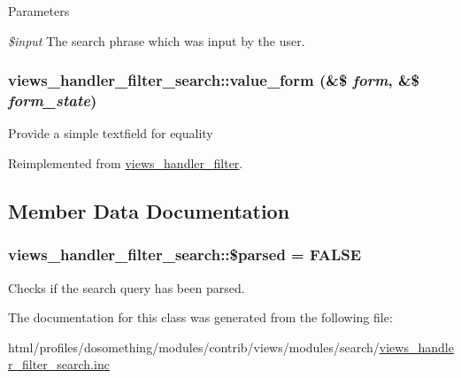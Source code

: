 \begin{DoxyParams}{Parameters}
\item[{\em \$input}]The search phrase which was input by the user. \end{DoxyParams}
\hypertarget{classviews__handler__filter__search_a60e1cc17477e80f07c703ae29348b329}{
\subsubsection[{value\_\-form}]{\setlength{\rightskip}{0pt plus 5cm}views\_\-handler\_\-filter\_\-search::value\_\-form (\&\$ {\em form}, \/  \&\$ {\em form\_\-state})}}
\label{classviews__handler__filter__search_a60e1cc17477e80f07c703ae29348b329}
Provide a simple textfield for equality 

Reimplemented from \hyperlink{classviews__handler__filter_a9168b39edae84b20e01a3fd0d810ba66}{views\_\-handler\_\-filter}.

\subsection{Member Data Documentation}
\hypertarget{classviews__handler__filter__search_ac2691a5da99694cf3cc5fd1f6c771a7a}{
\subsubsection[{\$parsed}]{\setlength{\rightskip}{0pt plus 5cm}views\_\-handler\_\-filter\_\-search::\$parsed = FALSE}}
\label{classviews__handler__filter__search_ac2691a5da99694cf3cc5fd1f6c771a7a}
Checks if the search query has been parsed. 

The documentation for this class was generated from the following file:\begin{DoxyCompactItemize}
\item 
html/profiles/dosomething/modules/contrib/views/modules/search/\hyperlink{views__handler__filter__search_8inc}{views\_\-handler\_\-filter\_\-search.inc}\end{DoxyCompactItemize}
